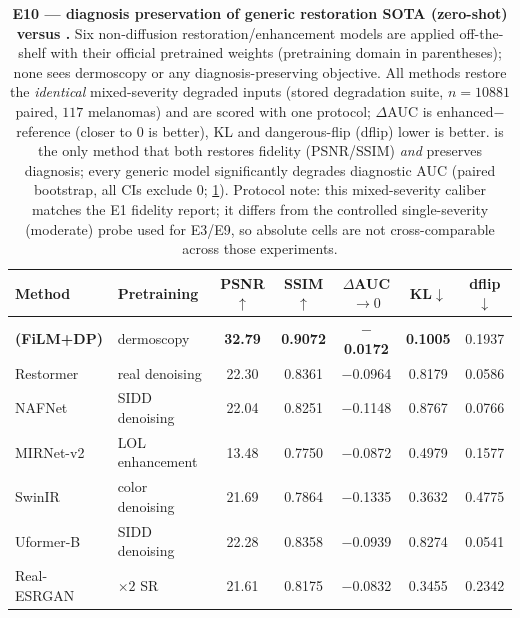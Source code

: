 \begin{table}[t]
\centering
\caption{\textbf{E10 --- diagnosis preservation of generic restoration SOTA (zero-shot) versus
\visienhance.} Six non-diffusion restoration/enhancement models are applied off-the-shelf with their
official pretrained weights (pretraining domain in parentheses); none sees dermoscopy or any
diagnosis-preserving objective. All methods restore the \emph{identical} mixed-severity degraded
inputs (stored degradation suite, $n{=}10881$ paired, $117$ melanomas) and are scored with one
protocol; $\Delta$AUC is enhanced$-$reference (closer to $0$ is better), KL and dangerous-flip
(dflip) lower is better. \visienhance{} is the only method that both restores fidelity (PSNR/SSIM)
\emph{and} preserves diagnosis; every generic model significantly degrades diagnostic AUC
(paired bootstrap, all CIs exclude $0$; \cref{tab:e10}). Protocol note: this mixed-severity caliber
matches the E1 fidelity report; it differs from the controlled single-severity (moderate) probe used
for E3/E9, so absolute cells are not cross-comparable across those experiments.}
\label{tab:e10}
\small
\begin{tabular}{l l c c c c c}
\toprule
Method & Pretraining & PSNR$\uparrow$ & SSIM$\uparrow$ & $\Delta$AUC$\to 0$ & KL$\downarrow$ & dflip$\downarrow$ \\
\midrule
\textbf{\visienhance{} (FiLM+DP)} & dermoscopy & \textbf{32.79} & \textbf{0.9072} & \textbf{$-$0.0172} & \textbf{0.1005} & 0.1937 \\
\midrule
Restormer \citep{zamir2022restormer}     & real denoising  & 22.30 & 0.8361 & $-$0.0964 & 0.8179 & 0.0586 \\
NAFNet \citep{chen2022simple}            & SIDD denoising  & 22.04 & 0.8251 & $-$0.1148 & 0.8767 & 0.0766 \\
MIRNet-v2 \citep{zamir2022mirnetv2}      & LOL enhancement & 13.48 & 0.7750 & $-$0.0872 & 0.4979 & 0.1577 \\
SwinIR \citep{liang2021swinir}           & color denoising & 21.69 & 0.7864 & $-$0.1335 & 0.3632 & 0.4775 \\
Uformer-B \citep{wang2022uformer}        & SIDD denoising  & 22.28 & 0.8358 & $-$0.0939 & 0.8274 & 0.0541 \\
Real-ESRGAN \citep{wang2021realesrgan}   & $\times2$ SR    & 21.61 & 0.8175 & $-$0.0832 & 0.3455 & 0.2342 \\
\bottomrule
\end{tabular}
\end{table}

